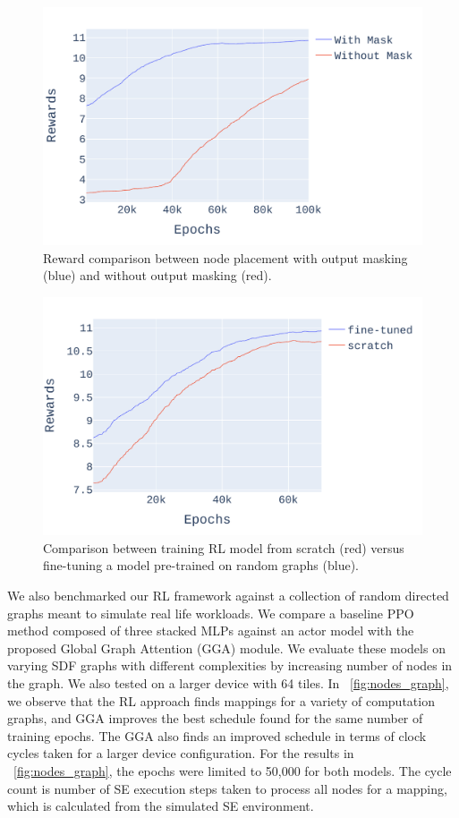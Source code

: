 \begin{figure}[tb]
  \centering
  \includegraphics[width=\linewidth]{fig/ifft_masked_nomask.pdf}
  \caption{Reward comparison between node placement with output masking (blue) and without output masking (red).}
  \label{fig:mask_nomask}
\end{figure}

\begin{figure}[tb]
  \centering
  \includegraphics[width=\linewidth]{fig/pretrain_ifft.pdf}
  \caption{Comparison between training RL model from scratch (red) versus fine-tuning a model pre-trained on random graphs (blue). }
  \label{fig:pretrain_ifft}
\end{figure}

We also benchmarked our RL framework against a collection of random directed graphs meant to simulate real life workloads. 
We compare a baseline PPO method composed of three stacked MLPs against an actor model with the proposed Global Graph Attention (GGA) module.
We evaluate these models on varying SDF graphs with different complexities by increasing number of nodes in the graph. 
We also tested on a larger device with 64 tiles.
In \figurename~\ref{fig:nodes_graph}, we observe that the RL approach finds mappings for a variety of computation graphs, and GGA improves the best schedule found for the same number of training epochs. 
The GGA also finds an improved schedule in terms of clock cycles taken for a larger device configuration. 
For the results in \figurename~\ref{fig:nodes_graph}, the epochs were limited to 50,000 for both models. 
The cycle count is number of SE execution steps taken to process all nodes for a mapping, which is calculated from the simulated SE environment. 

